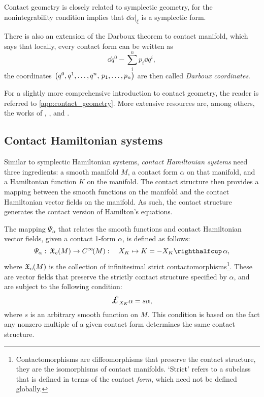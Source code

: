 Contact geometry is closely related to symplectic geometry, for the nonintegrability condition implies that \(\dd{\alpha}\vert_{\xi}\) is a symplectic form. 

There is also an extension of the Darboux theorem to contact manifold, which says that locally, every contact form can be written as
\begin{equation}
    \dd{q^0} - \sum_i^n p_i \dd{q^i}, 
    \label{eq:contact_darboux}
\end{equation} 
the coordinates \(\qty(q^0, q^1, \ldots, q^n,\, p_1, \ldots, p_n)\) are then called \emph{Darboux coordinates}.

For a slightly more comprehensive introduction to contact geometry, the reader is referred to \cref{app:contact_geometry}. More extensive resources are, among others, the works of \citet{Geiges2008}, \citet{Libermann1987}, \citet{Arnold1989,Arnold1989a} and \citet{Godbillon1969}.

\subsection{Contact Hamiltonian systems}
\label{ssec:contact_ham_systems}
Similar to symplectic Hamiltonian systems, \emph{contact Hamiltonian systems} need three ingredients: a smooth manifold \(M\), a contact form \(\alpha\) on that manifold, and a Hamiltonian function \(K\) on the manifold. The contact structure then provides a mapping between the smooth functions on the manifold and the contact Hamiltonian vector fields on the manifold. As such, the contact structure generates the contact version of Hamilton's equations.

The mapping \(\Psi_\alpha\) that relates the smooth functions and contact Hamiltonian vector fields, given a contact 1-form \(\alpha\), is defined as follows:
\begin{equation}
    \Psi_\alpha:\:\vsfields{c}{M} \to \functions{M}: \quad X_K \mapsto K = -\intpr{X_K}{\alpha}, 
    \label{eq:psi_definition}
\end{equation}
where \(\mathfrak{X}_{c}\qty(M)\) is the collection of infinitesimal strict contactomorphisms\footnote{Contactomorphisms are diffeomorphisms that preserve the contact structure, they are the isomorphisms of contact manifolds. `Strict' refers to a subclass that is defined in terms of the contact \emph{form}, which need not be defined globally.}. These are vector fields that preserve the strictly contact structure specified by \(\alpha\), and are subject to the following condition:
\begin{equation}
    \lied{X_K}{\alpha} = s \alpha, 
    \label{eq:contact_vf_condition}
\end{equation}
where \(s\) is an arbitrary smooth function on \(M\). This condition is based on the fact any nonzero multiple of a given contact form determines the same contact structure.

